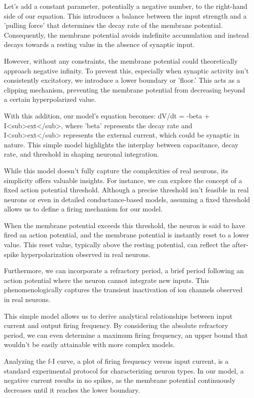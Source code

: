 Let's add a constant parameter, potentially a negative number, to the right-hand side of our equation. This introduces a balance between the input strength and a 'pulling force' that determines the decay rate of the membrane potential. Consequently, the membrane potential avoids indefinite accumulation and instead decays towards a resting value in the absence of synaptic input.

However, without any constraints, the membrane potential could theoretically approach negative infinity. To prevent this, especially when synaptic activity isn't consistently excitatory, we introduce a lower boundary or 'floor.' This acts as a clipping mechanism, preventing the membrane potential from decreasing beyond a certain hyperpolarized value.

With this addition, our model's equation becomes: dV/dt = -beta + I<sub>ext</sub>, where 'beta' represents the decay rate and I<sub>ext</sub> represents the external current, which could be synaptic in nature. This simple model highlights the interplay between capacitance, decay rate, and threshold in shaping neuronal integration.

While this model doesn't fully capture the complexities of real neurons, its simplicity offers valuable insights. For instance, we can explore the concept of a fixed action potential threshold. Although a precise threshold isn't feasible in real neurons or even in detailed conductance-based models, assuming a fixed threshold allows us to define a firing mechanism for our model.

When the membrane potential exceeds this threshold, the neuron is said to have fired an action potential, and the membrane potential is instantly reset to a lower value. This reset value, typically above the resting potential, can reflect the after-spike hyperpolarization observed in real neurons.

Furthermore, we can incorporate a refractory period, a brief period following an action potential where the neuron cannot integrate new inputs. This phenomenologically captures the transient inactivation of ion channels observed in real neurons.

This simple model allows us to derive analytical relationships between input current and output firing frequency. By considering the absolute refractory period, we can even determine a maximum firing frequency, an upper bound that wouldn't be easily attainable with more complex models.

Analyzing the f-I curve, a plot of firing frequency versus input current, is a standard experimental protocol for characterizing neuron types. In our model, a negative current results in no spikes, as the membrane potential continuously decreases until it reaches the lower boundary.

